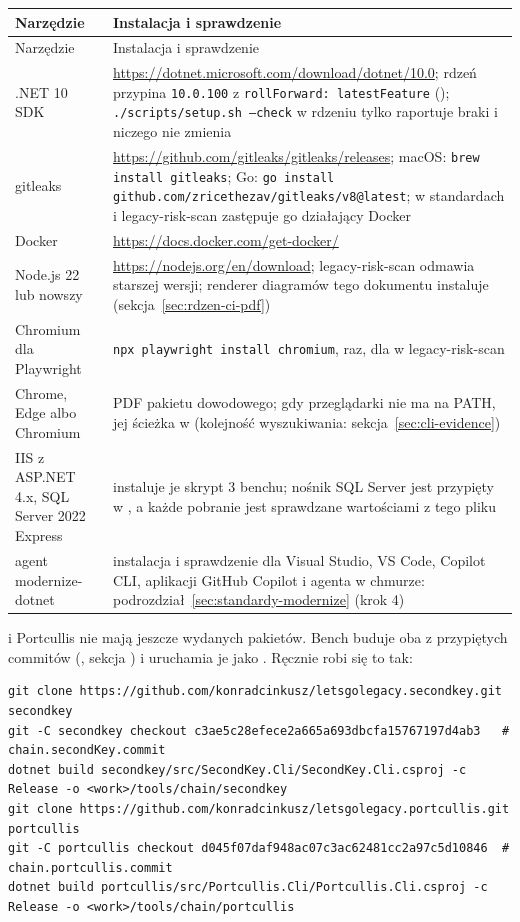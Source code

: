 \begin{xltabular}{\linewidth}{@{}>{\raggedright\arraybackslash}p{4.4cm} >{\raggedright\arraybackslash}X@{}}
\toprule
Narzędzie & Instalacja i sprawdzenie \\
\midrule
\endfirsthead
\toprule
Narzędzie & Instalacja i sprawdzenie \\
\midrule
\endhead
.NET 10 SDK & \url{https://dotnet.microsoft.com/download/dotnet/10.0}; rdzeń przypina \texttt{10.0.100} z \texttt{rollForward: latestFeature} (); \texttt{./scripts/setup.sh --check} w rdzeniu tylko raportuje braki i niczego nie zmienia \\
gitleaks & \url{https://github.com/gitleaks/gitleaks/releases}; macOS: \texttt{brew install gitleaks}; Go: \texttt{go install github.com/zricethezav/gitleaks/v8@latest}; w standardach i legacy-risk-scan zastępuje go działający Docker \\
Docker & \url{https://docs.docker.com/get-docker/} \\
Node.js 22 lub nowszy & \url{https://nodejs.org/en/download};  legacy-risk-scan odmawia starszej wersji; renderer diagramów tego dokumentu instaluje  (sekcja~\ref{sec:rdzen-ci-pdf}) \\
Chromium dla Playwright & \texttt{npx playwright install chromium}, raz, dla  w legacy-risk-scan \\
Chrome, Edge albo Chromium & PDF pakietu dowodowego; gdy przeglądarki nie ma na PATH, jej ścieżka w  (kolejność wyszukiwania: sekcja~\ref{sec:cli-evidence}) \\
IIS z ASP.NET 4.x, SQL Server 2022 Express & instaluje je skrypt 3 benchu; nośnik SQL Server jest przypięty w , a każde pobranie jest sprawdzane wartościami z tego pliku \\
agent modernize-dotnet & instalacja i sprawdzenie dla Visual Studio, VS Code, Copilot CLI, aplikacji GitHub Copilot i agenta w chmurze: podrozdział~\ref{sec:standardy-modernize} (krok 4) \\
\bottomrule
\end{xltabular}

 i Portcullis nie mają jeszcze wydanych pakietów. Bench buduje oba z
przypiętych commitów (, sekcja ) i uruchamia je jako
. Ręcznie robi się to tak:

\begin{lstlisting}
git clone https://github.com/konradcinkusz/letsgolegacy.secondkey.git secondkey
git -C secondkey checkout c3ae5c28efece2a665a693dbcfa15767197d4ab3   # chain.secondKey.commit
dotnet build secondkey/src/SecondKey.Cli/SecondKey.Cli.csproj -c Release -o <work>/tools/chain/secondkey
git clone https://github.com/konradcinkusz/letsgolegacy.portcullis.git portcullis
git -C portcullis checkout d045f07daf948ac07c3ac62481cc2a97c5d10846  # chain.portcullis.commit
dotnet build portcullis/src/Portcullis.Cli/Portcullis.Cli.csproj -c Release -o <work>/tools/chain/portcullis
\end{lstlisting}

